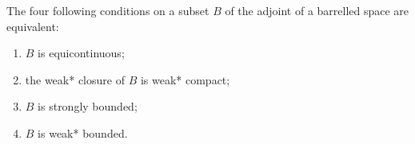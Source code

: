 The four following conditions on a subset $B$ of the adjoint of a barrelled space are equivalent:
\begin{enumerate}
\item $B$ is equicontinuous;
\item the weak* closure of $B$ is weak* compact;
\item $B$ is strongly bounded;
\item $B$ is weak* bounded.
\end{enumerate}
